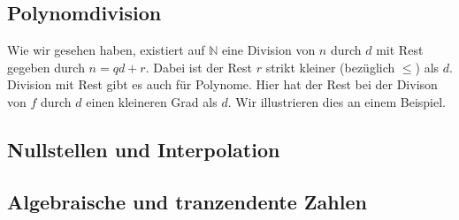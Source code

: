 \documentclass[../Analysis1_script.tex]{subfiles}
\begin{document}
\subsection{Polynomdivision}
	Wie wir gesehen haben, existiert auf $\mathbb {N}$ eine Division von $n$ durch $d$ mit Rest gegeben durch $n=qd+r$. Dabei ist der Rest $r$ strikt kleiner (bezüglich $\leq$) als $d$. Division mit Rest gibt es auch für Polynome. Hier hat der Rest bei der Divison von $f$ durch $d$ einen kleineren Grad als $d$. Wir illustrieren dies an einem Beispiel.
	
\begin{example}
\end{example}

\subsection{Nullstellen und Interpolation}

\subsection{Algebraische und tranzendente Zahlen}
\end{document}
